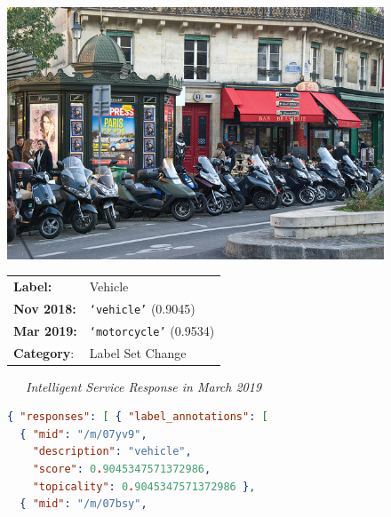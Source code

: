 \begin{figure}
    \begin{framed}
    \centering
    \begin{minipage}{\linewidth}
        \begin{shaded*}
            \begin{minipage}{0.3\linewidth}
            \includegraphics[width=\linewidth]{000000019109.jpeg}
            \end{minipage}
            \hfill
            \begin{minipage}{0.65\linewidth}
                \begin{tabular}{ll}
                \textbf{Label:}&Vehicle\\
                \textbf{Nov 2018:}&\texttt{`vehicle'} (0.9045)\\
                \textbf{Mar 2019:}&\texttt{`motorcycle'} (0.9534)\\
                \textbf{Category}:&Label Set Change
                \end{tabular}
            \end{minipage}
            \hfill
        \end{shaded*}
    \end{minipage}
    \begin{minipage}{\linewidth}
        \centering\bigskip
        \noindent\xrfill[0.45ex]{.5pt}~~~\textit{Intelligent Service Response in March 2019}~~~\xrfill[0.45ex]{.5pt}
        \begin{lstlisting}[language=json]
{ "responses": [ { "label_annotations": [
  { "mid": "/m/07yv9",
    "description": "vehicle",
    "score": 0.9045347571372986,
    "topicality": 0.9045347571372986 },
  { "mid": "/m/07bsy",

\end{lstlisting}
\end{minipage}
\end{framed}
\end{figure}
